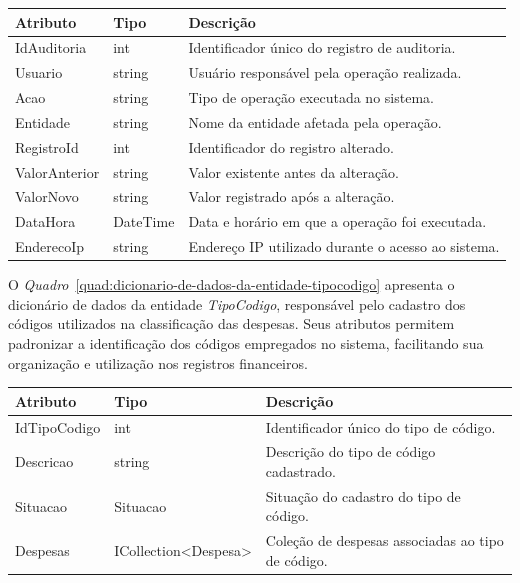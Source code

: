 \begin{quadro}[H]
\caption[Dicionário de dados da entidade Auditoria]{Dicionário de dados da entidade Auditoria}
\label{quad:dicionario-de-dados-da-entidade-auditoria}

\begin{tabular}{|p{}|p{}|p{}|}
\hline
\textbf{Atributo} & \textbf{Tipo} & \textbf{Descrição} \\ 
\hline
IdAuditoria & int & Identificador único do registro de auditoria. \\ 
\hline
Usuario & string & Usuário responsável pela operação realizada. \\ 
\hline
Acao & string & Tipo de operação executada no sistema. \\ 
\hline
Entidade & string & Nome da entidade afetada pela operação. \\ 
\hline
RegistroId & int & Identificador do registro alterado. \\ 
\hline
ValorAnterior & string & Valor existente antes da alteração. \\ 
\hline
ValorNovo & string & Valor registrado após a alteração. \\ 
\hline
DataHora & DateTime & Data e horário em que a operação foi executada. \\ 
\hline
EnderecoIp & string & Endereço IP utilizado durante o acesso ao sistema. \\ 
\hline
\end{tabular}


\end{quadro}


O \textit{Quadro}~\ref{quad:dicionario-de-dados-da-entidade-tipocodigo} apresenta o dicionário de dados da entidade \textit{TipoCodigo}, responsável pelo cadastro dos códigos utilizados na classificação das despesas. Seus atributos permitem padronizar a identificação dos códigos empregados no sistema, facilitando sua organização e utilização nos registros financeiros.

\begin{quadro}[H]
\caption[Dicionário de dados da entidade TipoCodigo]{Dicionário de dados da entidade TipoCodigo}
\label{quad:dicionario-de-dados-da-entidade-tipocodigo}

\begin{tabular}{|p{}|p{}|p{}|}
\hline
\textbf{Atributo} & \textbf{Tipo} & \textbf{Descrição} \\ 
\hline
IdTipoCodigo & int & Identificador único do tipo de código. \\ 
\hline
Descricao & string & Descrição do tipo de código cadastrado. \\ 
\hline
Situacao & Situacao & Situação do cadastro do tipo de código. \\ 
\hline
Despesas & ICollection<Despesa> & Coleção de despesas associadas ao tipo de código. \\ 
\hline
\end{tabular}


\end{quadro}


